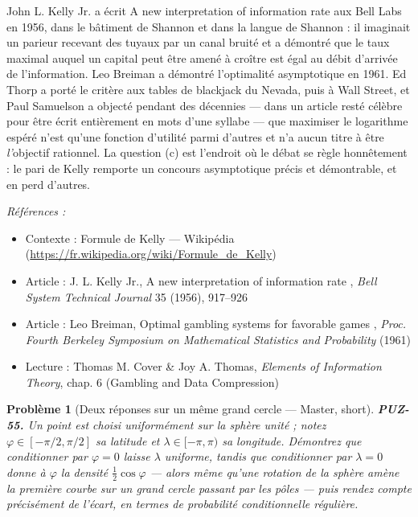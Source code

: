 \documentclass[11pt]{article}
\newtheorem{problem}{Problème}
\newenvironment{refs}{\par\small\noindent\emph{Références :}\begin{itemize}\setlength\itemsep{0pt}}{\end{itemize}\normalsize}
\begin{document}
\noindent John L. Kelly Jr. a écrit \og{} A new interpretation of information rate \fg{} aux
Bell Labs en 1956, dans le bâtiment de Shannon et dans la langue de Shannon : il imaginait un
parieur recevant des tuyaux par un canal bruité et a démontré que le taux maximal auquel un
capital peut être amené à croître est égal au débit d'arrivée de l'information. Leo Breiman a
démontré l'optimalité asymptotique en 1961. Ed Thorp a porté le critère aux tables de
blackjack du Nevada, puis à Wall Street, et Paul Samuelson a objecté pendant des décennies ---
dans un article resté célèbre pour être écrit entièrement en mots d'une syllabe --- que
maximiser le logarithme espéré n'est qu'une fonction d'utilité parmi d'autres et n'a aucun
titre à être \textit{l'}objectif rationnel. La question (c) est l'endroit où le débat se règle
honnêtement : le pari de Kelly remporte un concours asymptotique précis et démontrable, et en
perd d'autres.

\begin{refs}
\item Contexte : Formule de Kelly --- Wikipédia (\url{https://fr.wikipedia.org/wiki/Formule_de_Kelly})
\item Article : J. L. Kelly Jr., \og{} A new interpretation of information rate \fg{}, \textit{Bell System Technical Journal} 35 (1956), 917--926
\item Article : Leo Breiman, \og{} Optimal gambling systems for favorable games \fg{}, \textit{Proc. Fourth Berkeley Symposium on Mathematical Statistics and Probability} (1961)
\item Lecture : Thomas M. Cover \& Joy A. Thomas, \textit{Elements of Information Theory}, chap. 6 (Gambling and Data Compression)
\end{refs}

\bigskip

\begin{problem}[{Deux réponses sur un même grand cercle --- Master, short}]
\textbf{PUZ-55.} Un point est choisi uniformément sur la sphère unité ;
notez $ \varphi \in [-\pi/2, \pi/2] $ sa latitude et $ \lambda \in [-\pi, \pi) $ sa
longitude. Démontrez que conditionner par $ \varphi = 0 $ laisse $ \lambda $ uniforme,
tandis que conditionner par $ \lambda = 0 $ donne à $ \varphi $ la densité
$ \tfrac{1}{2}\cos\varphi $ --- alors même qu'une rotation de la sphère amène la première
courbe sur un grand cercle passant par les pôles --- puis rendez compte précisément de l'écart,
en termes de probabilité conditionnelle régulière.
\end{problem}
\end{document}
